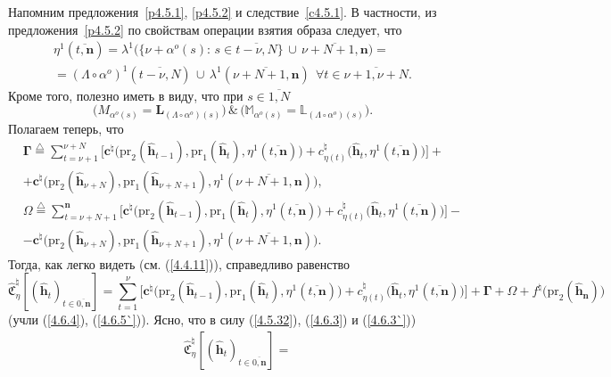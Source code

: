 \documentclass[12pt]{report}
\newcommand{\df}{\stackrel{\triangle}{=}}
\newcommand{\ov}{\overline}
\newcommand{\La}{\Lambda}
\newcommand{\la}{\lambda}
\newcommand{\al}{\alpha}
\newcommand{\fa}{\forall}
\newcommand{\bbl}{{\mathbb L}}
\newcommand{\bbm}{{\mathbb M}}
\newcommand{\zc}{{\mathbf c}}
\newcommand{\nn}{{\mathbf n}}
\begin{document}
{{Напомним предложения~\ref{p4.5.1}, \ref{p4.5.2} и следствие~\ref{c4.5.1}. В частности,
из предложения~\ref{p4.5.2}  по свойствам операции взятия образа следует, что
\begin{eqnarray}
&\eta^1(\ov{t,\mathbf{n}}) = \la^1\bigl(\{\nu+\al^o(s):\,s\in \ov{t-\nu,N}\}\,\cup\,
\ov{\nu+N+1,\nn}\bigl) =
&\nonumber\\
&= (\La \circ\al^o)^1(\ov{t-\nu,N})\,\cup\, \la^1(\ov{\nu+N+1,\nn})\ \ \fa t\in \ov{\nu+1,\nu+N}.
&\label{4.6.3`}
\end{eqnarray}
Кроме того, полезно иметь в виду, что при $s\in \ov{1,N}$
$$\bigl(M_{\al^o(s)} = \mathbf{L}_{(\La\circ \al^o)(s)}\bigl)\,\&\,\bigl(\bbm_{\al^o(s)} =
\bbl_{(\La\circ \al^o)(s)}\bigl).
$$
Полагаем теперь, что \cite[(5.10), (5.11)]{Cha13`}
\begin{eqnarray}
&\mathbf{\Gamma}\df \sum\limits_{t=\nu+1}^{\nu+N}
\bigl[\zc^\natural\bigl(\mathrm{pr}_2(\hat{\mathbf{h}}_{t-1}),\mathrm{pr}_1(\hat{\mathbf{h}}_t),
\eta^1(\ov{t,\nn})\bigl) + c_{\eta(t)}^\natural\bigl(\hat{\mathbf{h}}_t,\eta^1(\ov{t,\nn})\bigl)\bigl] +
&\nonumber\\
&+\zc^\natural\bigl(\mathrm{pr}_2(\hat{\mathbf{h}}_{\nu+N}),\mathrm{pr}_1
(\hat{\mathbf{h}}_{\nu+N+1}),\eta^1(\ov{\nu+N+1,\nn})\bigl),
&\label{4.6.4}
\end{eqnarray}
\begin{eqnarray}
&\Omega\df \sum\limits_{t=\nu+N+1}^\nn \bigl[\zc^\natural\bigl(\mathrm{pr}_2(\hat{\mathbf{h}}_{t-1}),
\mathrm{pr}_1(\hat{\mathbf{h}}_t),
\eta^1(\ov{t,\nn})\bigl) + c_{\eta(t)}^\natural\bigl(\hat{\mathbf{h}}_t,\eta^1(\ov{t,\nn})\bigl)\bigl] -
&\nonumber\\
&- \zc^\natural\bigl(\mathrm{pr}_2(\hat{\mathbf{h}}_{\nu+N}),\mathrm{pr}_1
(\hat{\mathbf{h}}_{\nu+N+1}),\eta^1(\ov{\nu+N+1,\nn})\bigl).
&\label{4.6.5`}
\end{eqnarray}
Тогда, как легко видеть (см. (\ref{4.4.11})), справедливо равенство
$$
\widehat{\mathfrak{C}}_\eta^\natural[(\hat{\mathbf{h}}_t)_{t\in\ov{0,\nn}}]=
\sum\limits_{t=1}^\nu \bigl[\zc^\natural\bigl(\mathrm{pr}_2(\hat{\mathbf{h}}_{t-1}),
\mathrm{pr}_1(\hat{\mathbf{h}}_t),
\eta^1(\ov{t,\nn})\bigl) + c_{\eta(t)}^\natural\bigl(\hat{\mathbf{h}}_t,\eta^1(\ov{t,\nn})\bigl)\bigl]
+\mathbf{\Gamma} + \Omega +f^\natural\bigl(\mathrm{pr}_2(\hat{\mathbf{h}}_\nn)\bigl)
$$
(учли (\ref{4.6.4}), (\ref{4.6.5`})). Ясно, что в силу (\ref{4.5.32}), (\ref{4.6.3}) и (\ref{4.6.3`}))
\begin{eqnarray}
&\widehat{\mathfrak{C}}_\eta^\natural[(\hat{\mathbf{h}}_t)_{t\in\ov{0,\nn}}]=

\end{eqnarray}}}
\end{document}
